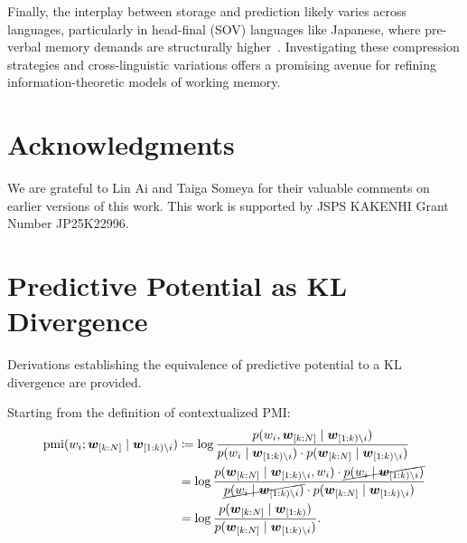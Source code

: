 \documentclass[11pt]{article}
\newcommand{\wseq}[2]{\ensuremath{\boldsymbol w_{[#1: #2]}}\xspace}
\newcommand{\curid}{\ensuremath{k}\xspace}
\newcommand{\sstartid}{\ensuremath{1}\xspace}
\newcommand{\sendid}{\ensuremath{N}\xspace}
\newcommand{\targetid}{\ensuremath{i}\xspace}
\newcommand{\wtarget}{\ensuremath{w_{\targetid}}\xspace}
\newcommand{\context}{\ensuremath{\boldsymbol w_{[\sstartid:\curid)}}\xspace}
\newcommand{\contextwotarget}{\ensuremath{\boldsymbol w_{[1:\curid)\setminus \targetid}}\xspace}
\newcommand{\future}{\ensuremath{\wseq{\curid}{\sendid}}\xspace}
\newcommand{\pmi}{\ensuremath{\operatorname{pmi}}\xspace}
\newcommand{\condprob}[2]{\ensuremath{p(#1\mid #2)}\xspace}
\newcommand{\condpmi}[3]{\ensuremath{\pmi(#1;#2\mid #3)}\xspace}
\begin{document}
Finally, the interplay between storage and prediction likely varies across languages, particularly in head-final (SOV) languages like Japanese, where pre-verbal memory demands are structurally higher~\citep{nakatani-gibson-2010,isono-etal-ur,isono-kajikawa-2026}.
Investigating these compression strategies and cross-linguistic variations offers a promising avenue for refining information-theoretic models of working memory.





\section*{Acknowledgments}
We are grateful to Lin Ai and Taiga Someya for their valuable comments on earlier versions of this work.
This work is supported by JSPS KAKENHI Grant Number JP25K22996.



\clearpage
\onecolumn
\appendix
{}


\section{Predictive Potential as KL Divergence}\label{app:kl}

Derivations establishing the equivalence of predictive potential to a KL divergence are provided.


Starting from the definition of contextualized PMI:
\begin{align}
    \condpmi{\wtarget}{\future}{\contextwotarget}
    &\coloneqq \log \frac{\condprob{\wtarget, \future}{\contextwotarget}}{\condprob{\wtarget}{\contextwotarget}\cdot \condprob{\future}{\contextwotarget}} \notag\\
    &= \log \frac{\condprob{\future}{\contextwotarget, \wtarget}\cdot \cancel{\condprob{\wtarget}{\contextwotarget}}}{\cancel{\condprob{\wtarget}{\contextwotarget}}\cdot \condprob{\future}{\contextwotarget}} \notag\\
    &= \log \frac{\condprob{\future}{\context}}{\condprob{\future}{\contextwotarget}}.
\end{align}
\end{document}
